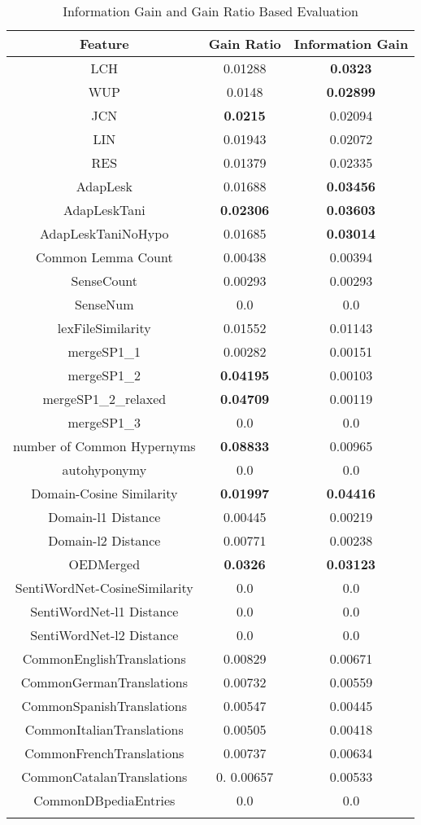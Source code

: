 \begin{center}
\begin{longtable}{| c | c | c |}      
\hline
\textbf{Feature} & \textbf{Gain Ratio} & \textbf{Information Gain} \\ \hline
LCH & 0.01288 & \textbf{0.0323} \\ \hline
WUP & 0.0148 & \textbf{0.02899} \\ \hline
JCN & \textbf{0.0215} & 0.02094 \\ \hline
LIN & 0.01943 & 0.02072 \\ \hline
RES & 0.01379 & 0.02335 \\ \hline
AdapLesk & 0.01688 & \textbf{0.03456} \\ \hline
AdapLeskTani & \textbf{0.02306} & \textbf{0.03603} \\ \hline
AdapLeskTaniNoHypo & 0.01685 & \textbf{0.03014} \\ \hline
\hline
Common Lemma Count & 0.00438 & 0.00394 \\ \hline
SenseCount & 0.00293 & 0.00293 \\ \hline
SenseNum & 0.0 & 0.0 \\ \hline
lexFileSimilarity & 0.01552 & 0.01143 \\ \hline
mergeSP1\_1 & 0.00282 & 0.00151 \\ \hline
mergeSP1\_2 & \textbf{0.04195} & 0.00103 \\ \hline
mergeSP1\_2\_relaxed & \textbf{0.04709} & 0.00119 \\ \hline
mergeSP1\_3 & 0.0 & 0.0 \\ \hline
number of Common Hypernyms & \textbf{0.08833} & 0.00965 \\ \hline
autohyponymy & 0.0 & 0.0 \\ \hline
\hline
Domain-Cosine Similarity & \textbf{0.01997} & \textbf{0.04416} \\ \hline
Domain-l1 Distance & 0.00445 & 0.00219 \\ \hline
Domain-l2 Distance & 0.00771 & 0.00238 \\ \hline
OEDMerged & \textbf{0.0326} & \textbf{0.03123} \\ \hline
SentiWordNet-CosineSimilarity & 0.0 & 0.0 \\ \hline
SentiWordNet-l1 Distance & 0.0 & 0.0 \\ \hline
SentiWordNet-l2 Distance & 0.0 & 0.0  \\ \hline
CommonEnglishTranslations & 0.00829 & 0.00671 \\ \hline
CommonGermanTranslations & 0.00732 & 0.00559 \\ \hline
CommonSpanishTranslations & 0.00547 & 0.00445 \\ \hline
CommonItalianTranslations & 0.00505 & 0.00418 \\ \hline
CommonFrenchTranslations & 0.00737 & 0.00634 \\ \hline
CommonCatalanTranslations & 0. 0.00657 & 0.00533 \\ \hline
CommonDBpediaEntries & 0.0 & 0.0 \\ \hline
\caption{Information Gain and Gain Ratio Based Evaluation}
\label{tab:FeatureWiseEvaluation}
\end{longtable}
\end{center}

